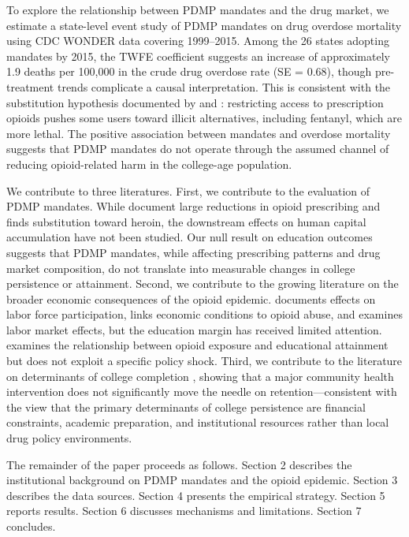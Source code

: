 \documentclass[12pt]{article}
\begin{document}
To explore the relationship between PDMP mandates and the drug market, we estimate a state-level event study of PDMP mandates on drug overdose mortality using CDC WONDER data covering 1999--2015. Among the 26 states adopting mandates by 2015, the TWFE coefficient suggests an increase of approximately 1.9 deaths per 100,000 in the crude drug overdose rate (SE = 0.68), though pre-treatment trends complicate a causal interpretation. This is consistent with the substitution hypothesis documented by \citet{alpert2018supply} and \citet{evans2019opioid}: restricting access to prescription opioids pushes some users toward illicit alternatives, including fentanyl, which are more lethal. The positive association between mandates and overdose mortality suggests that PDMP mandates do not operate through the assumed channel of reducing opioid-related harm in the college-age population.

We contribute to three literatures. First, we contribute to the evaluation of PDMP mandates. While \citet{buchmueller2018effect} document large reductions in opioid prescribing and \citet{mallatt2022effect} finds substitution toward heroin, the downstream effects on human capital accumulation have not been studied. Our null result on education outcomes suggests that PDMP mandates, while affecting prescribing patterns and drug market composition, do not translate into measurable changes in college persistence or attainment. Second, we contribute to the growing literature on the broader economic consequences of the opioid epidemic. \citet{krueger2017opioid} documents effects on labor force participation, \citet{hollingsworth2017opioid} links economic conditions to opioid abuse, and \citet{deshpande2024opioids} examines labor market effects, but the education margin has received limited attention. \citet{zuo2022opioids} examines the relationship between opioid exposure and educational attainment but does not exploit a specific policy shock. Third, we contribute to the literature on determinants of college completion \citep{bound2010have, dynarski2021act, denning2019propensity}, showing that a major community health intervention does not significantly move the needle on retention---consistent with the view that the primary determinants of college persistence are financial constraints, academic preparation, and institutional resources rather than local drug policy environments.

The remainder of the paper proceeds as follows. Section 2 describes the institutional background on PDMP mandates and the opioid epidemic. Section 3 describes the data sources. Section 4 presents the empirical strategy. Section 5 reports results. Section 6 discusses mechanisms and limitations. Section 7 concludes.
\end{document}
